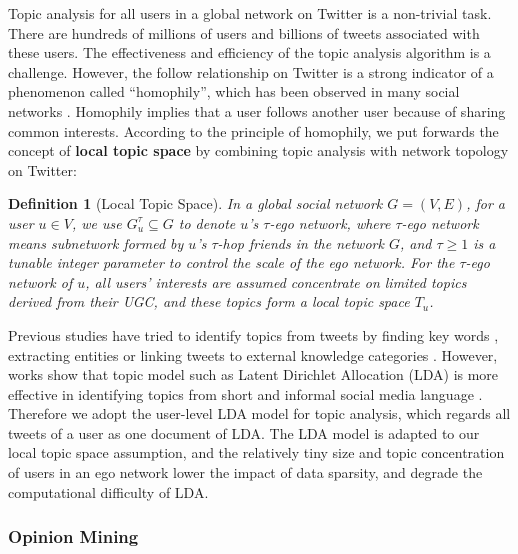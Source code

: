 \documentclass{acm_proc_article-sp}
\newtheorem{definition}{Definition}
\begin{document}
Topic analysis for all users in a global network on Twitter is a non-trivial task. 
There are hundreds of millions of users and billions of tweets associated with these users. The effectiveness and efficiency of the topic analysis algorithm is a challenge.
However, the follow relationship on Twitter is a strong indicator of a phenomenon called ``homophily'', which has been observed in many social networks \cite{mcpherson2001birds}.
Homophily implies that a user follows another user because of sharing common interests. 
According to the principle of homophily, we put forwards the concept of \textbf{local topic space} by combining topic analysis with network topology on Twitter: 
\begin{definition}[Local Topic Space]
\label{local}
In a global social network $G=\left( V,E \right) $, for a user $ u \in V $, we use $ G_{u}^{\tau} \subseteq G$ 
to denote $ u $'s $ \tau $-ego network, where $ \tau $-ego network means subnetwork formed by $ u $'s $ \tau $-hop 
friends in the network $ G $, and $ \tau \geqslant 1 $ is a tunable integer parameter to control the scale of the ego network. 
For the $ \tau $-ego network of $ u $, all users' interests are assumed concentrate on limited topics derived from their UGC, and these topics form a local topic space $ T_{u} $.
\end{definition}

Previous studies have tried to identify topics from tweets by finding key words \cite{chen2010short}, extracting  entities \cite{abel2011analyzing} or linking tweets to external knowledge categories \cite{macskassy2011people}. However, works show that topic model such as Latent Dirichlet Allocation (LDA) \cite{blei2003latent} is more effective in identifying topics from short and informal social media language \cite{hong2010empirical}. Therefore we adopt the user-level LDA model for topic analysis, which regards all tweets of a user as one document of LDA. The LDA model is adapted to our local topic space assumption, and the relatively tiny size and topic concentration of users in an ego network lower the impact of data sparsity, and degrade the computational difficulty of LDA. 

\subsubsection{Opinion Mining}
\label{opinion}
\end{document}
